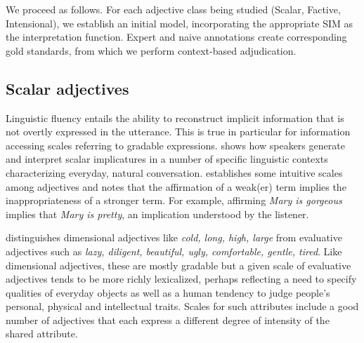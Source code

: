 \documentclass[10pt]{article}
\begin{document}
 
\noindent We proceed as follows. For each adjective class being studied (Scalar, Factive, Intensional), we establish an initial model, incorporating the appropriate SIM as the interpretation function. Expert and naive annotations create corresponding gold standards, from which we perform context-based adjudication. 
 





\subsection{Scalar adjectives}

Linguistic fluency entails the ability to reconstruct implicit information that is not overtly expressed in the utterance. 
This is true in particular 
for information accessing scales referring to gradable expressions. 
\cite{hirschberg1991theory} shows how speakers generate and interpret scalar implicatures 
in a number of specific linguistic contexts characterizing everyday, natural conversation. 
\cite{horn2000pick} establishes some intuitive scales among adjectives and notes 
that the affirmation of a weak(er) term implies the inappropriateness of a stronger term. 
For example, affirming \textit{Mary is gorgeous} implies that \textit{Mary is pretty}, an implication 
understood by the listener. 

\cite{bierwisch1989semantics} distinguishes dimensional adjectives like \textit{cold, long, high, large} 
from evaluative adjectives such as \textit{lazy, diligent, beautiful, ugly, comfortable, 
gentle, tired}. Like dimensional adjectives, these are mostly gradable but a given scale 
of evaluative adjectives tends to be more richly lexicalized, perhaps reflecting a need to specify 
qualities of everyday objects as well as a human tendency to judge people's personal, physical and intellectual traits. 
Scales for such attributes include a good number of 
adjectives that each express a different degree of intensity of the shared attribute.
\end{document}
